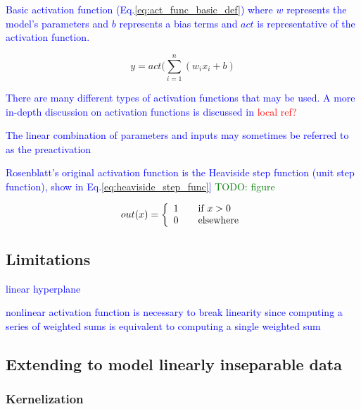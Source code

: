 \textcolor{blue}{Basic activation function (Eq.\ref{eq:act_func_basic_def}) where $w$ represents the model's parameters and $b$ represents a bias terms and $act$ is representative of the activation function.}

\begin{equation}
{y = act (\sum_{i=1}^{n}(w_i x_i + b)}
\label{eq:act_func_basic_def}
\end{equation}

\textcolor{blue}{There are many different types of activation functions that may be used. A more in-depth discussion on activation functions is discussed in \textcolor{red}{local ref?}}

\textcolor{blue}{The linear combination of parameters and inputs may sometimes be referred to as the preactivation}

\textcolor{blue}{Rosenblatt's original activation function is the {Heaviside step function} ({unit step function}), show in Eq.\ref{eq:heaviside_step_func}] \textcolor{green}{TODO: figure}}

\begin{equation}
{out(x) = \left\{
	\begin{array}{ll}
	1 & \quad $if $ x > 0 \\
	0 & \quad $elsewhere$
	\end{array}
	\right.}
\label{eq:heaviside_step_func}
\end{equation}



\subsection{Limitations}

\textcolor{blue}{linear hyperplane}

\textcolor{blue}{nonlinear activation function is necessary to break linearity since computing a series of weighted sums is equivalent to computing a single weighted sum}

\subsection{Extending to model linearly inseparable data}

\subsubsection{Kernelization}

